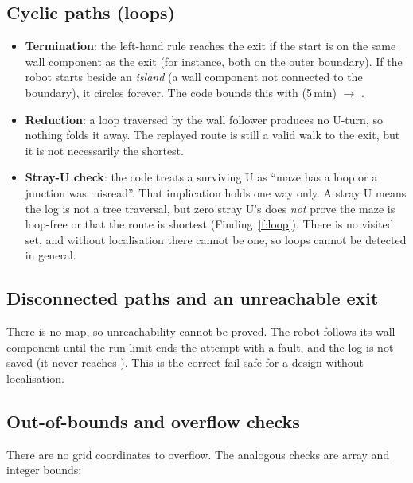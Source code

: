 \documentclass[11pt,a4paper]{article}
\newcommand{\code}[1]{\texttt{\detokenize{#1}}}
\theoremstyle{plain}
\theoremstyle{definition}
\begin{document}
\subsection{Cyclic paths (loops)}\label{sec:cycles}
\begin{itemize}
  \item \textbf{Termination}: the left-hand rule reaches the exit if the
        start is on the same wall component as the exit (for instance, both
        on the outer boundary). If the robot starts beside an \emph{island}
        (a wall component not connected to the boundary), it circles
        forever. The code bounds this with \code{MAX_RUN_MS} (5\,min)
        $\to$ \code{WM_FAULT}.
  \item \textbf{Reduction}: a loop traversed by the wall follower produces
        no U-turn, so nothing folds it away. The replayed route is still a
        valid walk to the exit, but it is not necessarily the shortest.
  \item \textbf{Stray-U check}: the code treats a surviving U as ``maze has
        a loop or a junction was misread''. That implication holds one way
        only. A stray U means the log is not a tree traversal, but zero
        stray U's does \emph{not} prove the maze is loop-free or that the
        route is shortest (Finding~\ref{f:loop}). There is no visited set,
        and without localisation there cannot be one, so loops cannot be
        detected in general.
\end{itemize}

\subsection{Disconnected paths and an unreachable exit}
There is no map, so unreachability cannot be proved. The robot follows its
wall component until the run limit ends the attempt with a fault, and the
log is not saved (it never reaches \code{WM_DONE}). This is the correct
fail-safe for a design without localisation.

\subsection{Out-of-bounds and overflow checks}
There are no grid coordinates to overflow. The analogous checks are array
and integer bounds:
\end{document}
